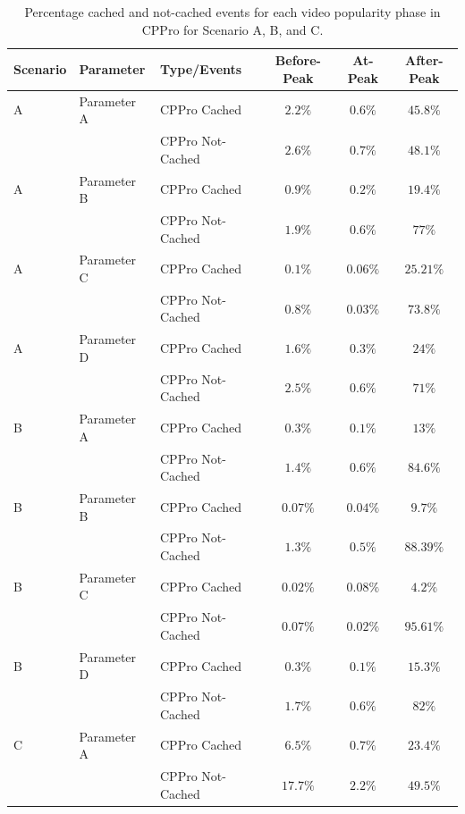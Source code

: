 \documentclass[10pt,final,journal,a4paper]{IEEEtran}
\begin{document}
\begin{table}[!t]
\caption{Percentage cached and not-cached events for each video popularity phase in CPPro for Scenario A, B, and C.}
\label{tab:stacked2}
\centering
\begin{tabular}{|l|l|l|c|c|c|}
\hline
Scenario & Parameter & Type/Events & Before-Peak & At-Peak  & After-Peak \\
\hline
A & Parameter A & CPPro Cached & $2.2\%$ & $0.6\%$ & $45.8\%$  \\
\hline
 & & CPPro Not-Cached & $2.6\%$ & $0.7\%$ & $48.1\%$ \\
 \hline

A & Parameter B & CPPro Cached & $0.9\%$ & $0.2\%$ & $19.4\%$ \\
\hline
 & & CPPro Not-Cached & $1.9\%$ & $0.6\%$ & $77\%$ \\
\hline

A & Parameter C & CPPro Cached & $0.1\%$ & $0.06\%$ & $25.21\%$ \\
\hline
 & & CPPro Not-Cached & $0.8\%$ & $0.03\%$ & $73.8\%$ \\
\hline

A & Parameter D & CPPro Cached & $1.6\%$ & $0.3\%$ & $24\%$ \\
\hline
 & & CPPro Not-Cached & $2.5\%$ & $0.6\%$ & $71\%$ \\
\hline

B & Parameter A & CPPro Cached & $0.3\%$ & $0.1\%$ & $13\%$  \\
\hline
 & & CPPro Not-Cached & $1.4\%$ & $0.6\%$ & $84.6\%$ \\
 \hline

B & Parameter B & CPPro Cached & $0.07\%$ & $0.04\%$ & $9.7\%$ \\
\hline
 & & CPPro Not-Cached & $1.3\%$ & $0.5\%$ & $88.39\%$ \\
\hline

B & Parameter C & CPPro Cached & $0.02\%$ & $0.08\%$ & $4.2\%$ \\
\hline
 & & CPPro Not-Cached & $0.07\%$ & $0.02\%$ & $95.61\%$ \\
\hline

B & Parameter D & CPPro Cached & $0.3\%$ & $0.1\%$ & $15.3\%$ \\
\hline
 & & CPPro Not-Cached & $1.7\%$ & $0.6\%$ & $82\%$ \\
\hline

C & Parameter A & CPPro Cached & $6.5\%$ & $0.7\%$ & $23.4\%$  \\
\hline
 & & CPPro Not-Cached & $17.7\%$ & $2.2\%$ & $49.5\%$ \\
 \hline


\end{tabular}
\end{table}
\end{document}
